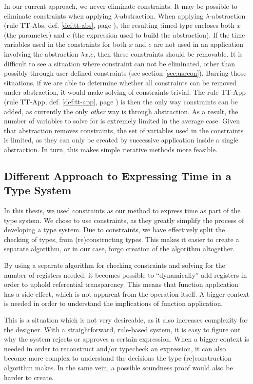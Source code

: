 In our current approach, we never eliminate constraints.
It may be possible to eliminate constraints when applying $\lambda$-abstraction.
When applying $\lambda$-abstraction (rule TT-Abs, def. \ref{def:tt-abs}, page \pageref{def:tt-abs}), the resulting timed type encloses both $x$ (the parameter) and $e$ (the expression used to build the abstraction).
If the time variables used in the constraints for both $x$ and $e$ are not used in an application involving the abstraction $\lambda x.e$, then these constraints should be removable.
It is difficult to see a situation where constraint can not be eliminated, other than possibly through user defined constraints (see section \ref{sec:usrcon}).
Barring those situations, if we are able to determine whether all constraints can be removed under abstraction, it would make solving of constraints trivial.
The rule TT-App (rule TT-App, def. \ref{def:tt-app}, page \pageref{def:tt-app}) is then the only way constraints can be added, as currently the only \textit{other} way is through abstraction.
As a result, the number of variables to solve for is extremely limited in the average case.
Given that abstraction removes constraints, the set of variables used in the constraints is limited, as they can only be created by successive application inside a single abstraction.
In turn, this makes simple iterative methods more feasible.

\subsection{Different Approach to Expressing Time in a Type System}
In this thesis, we used constraints as our method to express time as part of the type system.
We chose to use constraints, as they greatly simplify the process of developing a type system.
Due to constraints, we have effectively split the checking of types, from (re)constructing types.
This makes it easier to create a separate algorithm, or in our case, forgo creation of the algorithm altogether.

By using a separate algorithm for checking constraints and solving for the number of registers needed, it becomes possible to ``dynamically'' add registers in order to uphold referential transparency.
This means that function application has a side-effect, which is not apparent from the operation itself.
A bigger context is needed in order to understand the implications of function application.

This is a situation which is not very desireable, as it also increases complexity for the designer.
With a straightforward, rule-based system, it is easy to figure out why the system rejects or approves a certain expression.
When a bigger context is needed in order to reconstruct and/or typecheck an expression, it can also become more complex to understand the decisions the type (re)construction algorithm makes.
In the same vein, a possible soundness proof would also be harder to create.


